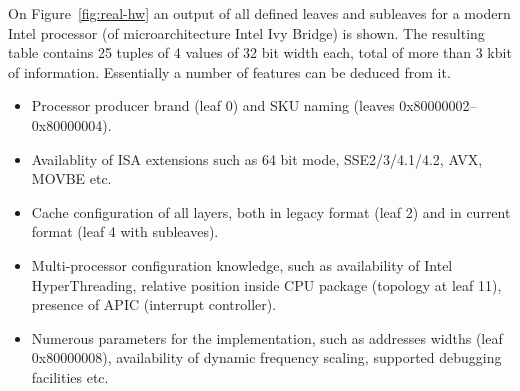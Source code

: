 \documentclass[a4paper,10pt,oneside,unicode]{article}
\begin{document}
On Figure~\ref{fig:real-hw} an output of all defined leaves and subleaves for a modern Intel processor (of microarchitecture Intel Ivy Bridge) is shown. The resulting table contains 25 tuples of 4 values of 32 bit width each, total of more than 3 kbit of information. Essentially a number of features can be deduced from it.
\begin{itemize}
    \item Processor producer brand (leaf 0) and SKU naming (leaves 0x80000002--0x80000004).
    \item Availablity of ISA extensions such as 64 bit mode, SSE2/3/4.1/4.2, AVX, MOVBE etc.
    \item Cache configuration of all layers, both in legacy format (leaf 2) and in current format (leaf 4 with subleaves).
    \item Multi-processor configuration knowledge, such as availability of Intel HyperThreading, relative position inside {CPU} package (topology at leaf 11), presence of {APIC} (interrupt controller).
    \item Numerous parameters for the implementation, such as addresses widths (leaf 0x80000008), availability of dynamic frequency scaling, supported debugging facilities etc.
\end{itemize}
\end{document}
